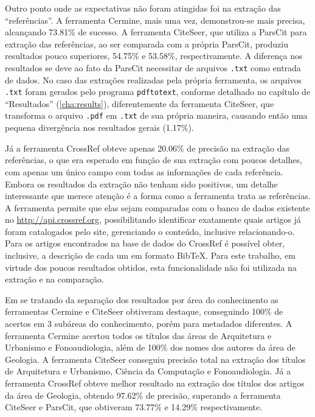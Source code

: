 Outro ponto onde as expectativas não foram atingidas foi na extração das ``referências''. 
A ferramenta Cermine, mais uma vez, demonstrou-se mais precisa, alcançando 73.81\% de sucesso. 
A ferramenta CiteSeer, que utiliza a ParsCit para extração das referências, ao ser comparada com a própria ParsCit, produziu resultados pouco superiores, 54.75\% e 53.58\%, respectivamente. 
A diferença nos resultados se deve ao fato da ParsCit necessitar de arquivos \texttt{.txt} como entrada de dados. 
No caso das extrações realizadas pela própria ferramenta, os arquivos \texttt{.txt} foram gerados pelo programa \texttt{pdftotext}, conforme detalhado no capítulo de ``Resultados'' (\autoref{cha:results}), diferentemente da ferramenta CiteSeer, que transforma o arquivo \texttt{.pdf} em \texttt{.txt} de sua própria maneira, causando então uma pequena divergência nos resultados gerais (1.17\%). 

Já a ferramenta CrossRef obteve apenas 20.06\% de precisão na extração das referências, o que era esperado em função de sua extração com poucos detalhes, com apenas um único campo com todas as informações de cada referência. 
Embora os resultados da extração não tenham sido positivos, um detalhe interessante que merece atenção é a forma como a ferramenta trata as referências. 
A ferramenta permite que elas sejam comparadas com o banco de dados existente no \url{http://api.crossref.org}, possibilitando identificar exatamente quais artigos já foram catalogados pelo site, gerenciando o conteúdo, inclusive relacionando-o. 
Para os artigos encontrados na base de dados do CrossRef é possível obter, inclusive, a descrição de cada um em formato BibTeX. 
Para este trabalho, em virtude dos poucos resultados obtidos, esta funcionalidade não foi utilizada na extração e na comparação.

Em se tratando da separação dos resultados por área do conhecimento as ferramentas Cermine e CiteSeer obtiveram destaque, conseguindo 100\% de acertos em 3 subáreas do conhecimento, porém para metadados diferentes. 
A ferramenta Cermine acertou todos os títulos das áreas de Arquitetura e Urbanismo e Fonoaudiologia, além de 100\% dos nomes dos autores da área de Geologia. 
A ferramenta CiteSeer conseguiu precisão total na extração dos títulos de Arquitetura e Urbanismo, Ciência da Computação e Fonoaudiologia. 
Já a ferramenta CrossRef obteve melhor resultado na extração dos títulos dos artigos da área de Geologia, obtendo 97.62\% de precisão, superando a ferramenta CiteSeer e ParsCit, que obtiveram 73.77\% e 14.29\% respectivamente.

